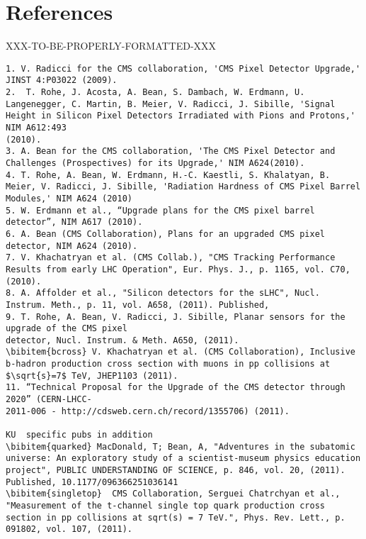 \section*{References}

XXX-TO-BE-PROPERLY-FORMATTED-XXX

\begin{verbatim}
1. V. Radicci for the CMS collaboration, 'CMS Pixel Detector Upgrade,' JINST 4:P03022 (2009).
2.  T. Rohe, J. Acosta, A. Bean, S. Dambach, W. Erdmann, U. Langenegger, C. Martin, B. Meier, V. Radicci, J. Sibille, 'Signal Height in Silicon Pixel Detectors Irradiated with Pions and Protons,' NIM A612:493
(2010).
3. A. Bean for the CMS collaboration, 'The CMS Pixel Detector and Challenges (Prospectives) for its Upgrade,' NIM A624(2010).
4. T. Rohe, A. Bean, W. Erdmann, H.-C. Kaestli, S. Khalatyan, B. Meier, V. Radicci, J. Sibille, 'Radiation Hardness of CMS Pixel Barrel Modules,' NIM A624 (2010)
5. W. Erdmann et al., “Upgrade plans for the CMS pixel barrel detector”, NIM A617 (2010).
6. A. Bean (CMS Collaboration), Plans for an upgraded CMS pixel detector, NIM A624 (2010).
7. V. Khachatryan et al. (CMS Collab.), "CMS Tracking Performance Results from early LHC Operation", Eur. Phys. J., p. 1165, vol. C70,(2010).
8. A. Affolder et al., "Silicon detectors for the sLHC", Nucl. Instrum. Meth., p. 11, vol. A658, (2011). Published,
9. T. Rohe, A. Bean, V. Radicci, J. Sibille, Planar sensors for the upgrade of the CMS pixel
detector, Nucl. Instrum. & Meth. A650, (2011).
\bibitem{bcross} V. Khachatryan et al. (CMS Collaboration), Inclusive b-hadron production cross section with muons in pp collisions at $\sqrt{s}=7$ TeV, JHEP1103 (2011).
11. “Technical Proposal for the Upgrade of the CMS detector through 2020” (CERN-LHCC-
2011-006 - http://cdsweb.cern.ch/record/1355706) (2011).
 
KU  specific pubs in addition
\bibitem{quarked} MacDonald, T; Bean, A, "Adventures in the subatomic universe: An exploratory study of a scientist-museum physics education project", PUBLIC UNDERSTANDING OF SCIENCE, p. 846, vol. 20, (2011). Published, 10.1177/096366251036141
\bibitem{singletop}  CMS Collaboration, Serguei Chatrchyan et al., "Measurement of the t-channel single top quark production cross section in pp collisions at sqrt(s) = 7 TeV.", Phys. Rev. Lett., p. 091802, vol. 107, (2011).

\end{verbatim}